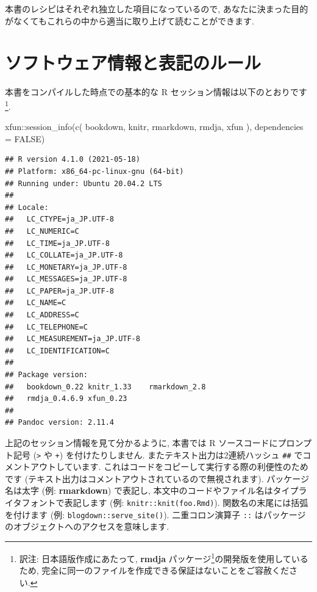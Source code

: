\documentclass[
  11pt,
  lualatex,ja=standard,jafont=noto]{bxjsreport}
\newenvironment{Shaded}{\begin{snugshade}}{\end{snugshade}}
\newcommand{\AttributeTok}[1]{\textcolor[rgb]{0.77,0.63,0.00}{#1}}
\newcommand{\ConstantTok}[1]{\textcolor[rgb]{0.00,0.00,0.00}{#1}}
\newcommand{\FunctionTok}[1]{\textcolor[rgb]{0.00,0.00,0.00}{#1}}
\newcommand{\NormalTok}[1]{#1}
\newcommand{\SpecialCharTok}[1]{\textcolor[rgb]{0.00,0.00,0.00}{#1}}
\newcommand{\StringTok}[1]{\textcolor[rgb]{0.31,0.60,0.02}{#1}}
\renewcommand{\href}[2]{#2\footnote{\url{#1}}}
\begin{document}
本書のレシピはそれぞれ独立した項目になっているので, あなたに決まった目的がなくてもこれらの中から適当に取り上げて読むことができます.

\hypertarget{software-info}{%
\section*{ソフトウェア情報と表記のルール}\label{software-info}}

本書をコンパイルした時点での基本的な R セッション情報は以下のとおりです\footnote{訳注: 日本語版作成にあたって, \href{https://github.com/Gedevan-Aleksizde/rmdja}{\textbf{rmdja} パッケージ}の開発版を使用しているため, 完全に同一のファイルを作成できる保証はないことをご容赦ください.}.

\begin{Shaded}
\begin{Highlighting}[numbers=left,,]
\NormalTok{xfun}\SpecialCharTok{::}\FunctionTok{session\_info}\NormalTok{(}\FunctionTok{c}\NormalTok{(}
  \StringTok{\textquotesingle{}bookdown\textquotesingle{}}\NormalTok{, }\StringTok{\textquotesingle{}knitr\textquotesingle{}}\NormalTok{, }\StringTok{\textquotesingle{}rmarkdown\textquotesingle{}}\NormalTok{, }\StringTok{\textquotesingle{}rmdja\textquotesingle{}}\NormalTok{, }\StringTok{\textquotesingle{}xfun\textquotesingle{}}
\NormalTok{), }\AttributeTok{dependencies =} \ConstantTok{FALSE}\NormalTok{)}
\end{Highlighting}
\end{Shaded}

\begin{verbatim}
## R version 4.1.0 (2021-05-18)
## Platform: x86_64-pc-linux-gnu (64-bit)
## Running under: Ubuntu 20.04.2 LTS
## 
## Locale:
##   LC_CTYPE=ja_JP.UTF-8      
##   LC_NUMERIC=C              
##   LC_TIME=ja_JP.UTF-8       
##   LC_COLLATE=ja_JP.UTF-8    
##   LC_MONETARY=ja_JP.UTF-8   
##   LC_MESSAGES=ja_JP.UTF-8   
##   LC_PAPER=ja_JP.UTF-8      
##   LC_NAME=C                 
##   LC_ADDRESS=C              
##   LC_TELEPHONE=C            
##   LC_MEASUREMENT=ja_JP.UTF-8
##   LC_IDENTIFICATION=C       
## 
## Package version:
##   bookdown_0.22 knitr_1.33    rmarkdown_2.8
##   rmdja_0.4.6.9 xfun_0.23    
## 
## Pandoc version: 2.11.4
\end{verbatim}

上記のセッション情報を見て分かるように, 本書では R ソースコードにプロンプト記号 (\texttt{\textgreater{}} や \texttt{+}) を付けたりしません. またテキスト出力は2連続ハッシュ \texttt{\#\#} でコメントアウトしています. これはコードをコピーして実行する際の利便性のためです (テキスト出力はコメントアウトされているので無視されます). パッケージ名は太字 (例: \textbf{rmarkdown}) で表記し, 本文中のコードやファイル名はタイプライタフォントで表記します (例: \texttt{knitr::knit(\textquotesingle{}foo.Rmd\textquotesingle{})}). 関数名の末尾には括弧を付けます (例: \texttt{blogdown::serve\_site()}). 二重コロン演算子 \texttt{::} はパッケージのオブジェクトへのアクセスを意味します.
\end{document}
